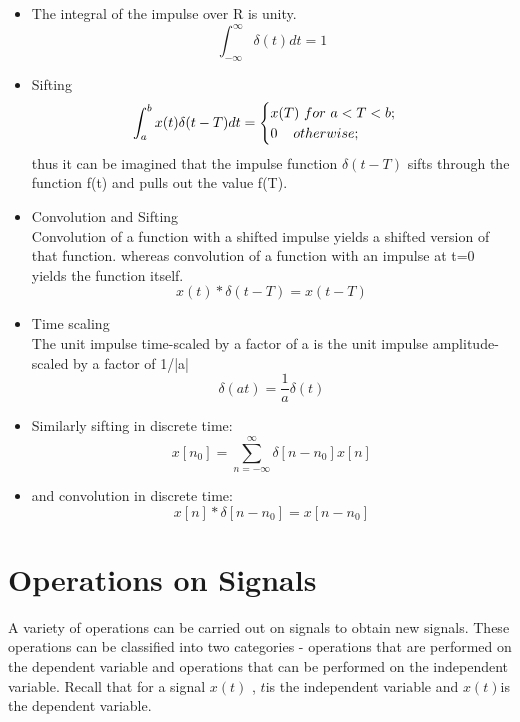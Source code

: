 \documentclass[a4paper,12pt]{book}
\begin{document}
\begin{itemize}
\item The integral of the impulse over R is unity.
$$\int_{-\infty}^{\infty}\delta (t)dt = 1$$
\item Sifting\\
$$\int_{a}^{b}x(t)\delta(t-T)dt=\begin{cases}
x(T) \,\,for\,\, a<T<b;\\
0\hspace{4mm} otherwise;\\
\end{cases} $$
thus it can be imagined that the impulse function $\delta(t-T)$ sifts through the function f(t) and pulls out the value f(T).\\
\item Convolution and Sifting\\
Convolution of a function with a shifted impulse yields a shifted version of that function. whereas convolution of a function with an impulse at t=0 yields the function itself.
$$x(t) \ast \delta(t-T) = x(t-T)$$
\item Time scaling\\
The unit impulse time-scaled by a factor of a is the unit impulse amplitude-scaled by a factor of 1/|a|\\
$$\delta(at)=\frac{1}{a}\delta(t)$$
\item Similarly sifting in discrete time:\\
$$x[n_0] = \sum_{n = -\infty}^\infty \delta[n - n_0] x[n]$$
\item and convolution in discrete time:\\
$$x[n] \ast \delta[n-n_0] = x[n-n_0]  $$
\end{itemize}




\section{Operations on Signals}
A variety of operations can be carried out on signals to obtain new signals. These operations can be classified into two categories - operations that are performed on the dependent variable and operations that can be performed on the independent variable. Recall that for a signal $x(t)$ , $t$is the independent variable and $x(t)$is the dependent variable.
\end{document}
